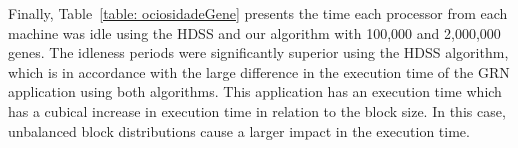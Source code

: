 \documentclass[journal]{IEEEtran}
\begin{document}
Finally, Table~\ref{table: ociosidadeGene} presents the time each processor from
each machine was idle using the HDSS and our algorithm with 100,000 and
2,000,000 genes. The idleness periods were significantly superior using the HDSS
algorithm, which is in accordance with the large difference in the execution time of
the GRN application using both algorithms. This application has an execution
time which has a cubical increase in execution time in relation to the block
size. In this case, unbalanced block distributions cause a larger impact in the
execution time.





\end{document}
